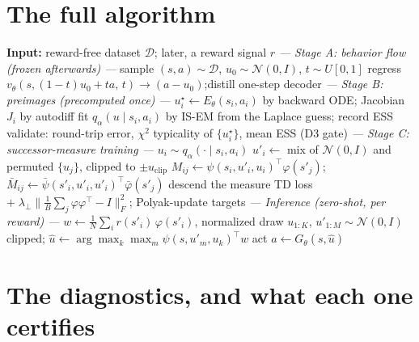 \documentclass[11pt]{article}
\newcommand{\D}{\mathcal{D}}
\begin{document}
\section{The full algorithm}

\begin{algorithm}[h]
\caption{PSMFlows (as implemented on \texttt{feat/psm-integration})}
\begin{algorithmic}[1]
\State \textbf{Input:} reward-free dataset $\D$; later, a reward signal $r$
\Statex \emph{--- Stage A: behavior flow (frozen afterwards) ---}
  \State sample $(s,a)\sim\D$, $u_0\sim\mathcal{N}(0,I)$, $t\sim U[0,1]$
  \State regress $v_\theta(s,(1-t)u_0+ta,\,t)\to(a-u_0)$;\quad distill one-step decoder
\EndFor
\Statex \emph{--- Stage B: preimages (precomputed once) ---}
\For{each $(s_i,a_i)\in\D$}
  \State $u_i^\star \gets E_\theta(s_i,a_i)$ by backward ODE; Jacobian $J_i$ by autodiff
  \State fit $q_\alpha(u\mid s_i,a_i)$ by IS-EM from the Laplace guess; record ESS
\EndFor
\State validate: round-trip error, $\chi^2$ typicality of $\{u_i^\star\}$, mean ESS (D3 gate)
\Statex \emph{--- Stage C: successor-measure training ---}
  \State $u_i\sim q_\alpha(\cdot\mid s_i,a_i)$ 
  \State $u'_i\gets$ mix of $\mathcal{N}(0,I)$ and permuted $\{u_j\}$, clipped to $\pm u_{\text{clip}}$
  \State $M_{ij}\gets\psi(s_i,u'_i,u_i)^\top\varphi(s'_j)$;\quad
         $\bar M_{ij}\gets\bar\psi(s'_i,u'_i,u'_i)^\top\bar\varphi(s'_j)$ 
  \State descend the measure TD loss $+\;\lambda_\perp\|\tfrac1B\sum_j\varphi\varphi^\top-I\|_F^2$;
         Polyak-update targets
\EndFor
\Statex \emph{--- Inference (zero-shot, per reward) ---}
\State $w\gets\frac1N\sum_i r(s'_i)\,\varphi(s'_i)$, normalized
  \State draw $u_{1:K},\,u'_{1:M}\sim\mathcal{N}(0,I)$ clipped;\quad
         $\hat u\gets\arg\max_k \max_m \psi(s,u'_m,u_k)^\top w$
  \State act $a\gets G_\theta(s,\hat u)$ 
\EndFor
\end{algorithmic}
\end{algorithm}

\section{The diagnostics, and what each one certifies}
\end{document}
